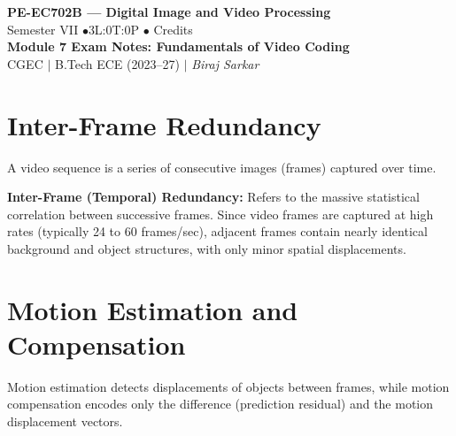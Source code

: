 \documentclass[12pt,a4paper]{article}
\begin{document}

\begin{center}
  {\LARGE\bfseries\color{myred} PE-EC702B --- Digital Image and Video Processing}\\[5pt]
  {\normalsize\color{mydark} Semester VII \quad$\bullet$\quad 3L:0T:0P \quad$\bullet$ Credits}\\[3pt]
  {\normalsize\color{myteal}\textbf{Module 7 Exam Notes: Fundamentals of Video Coding}}\\[3pt]
  {\small\color{mydark} CGEC \;$|$\; B.Tech ECE (2023--27) \;$|$\; \textit{Biraj Sarkar}}
\end{center}
\vspace{2pt}
\noindent{\color{myred}\rule{\linewidth}{1.5pt}}
\vspace{2pt}

\hypersetup{linkcolor=mydark}
\tableofcontents
\hypersetup{linkcolor=myteal}
\newpage

\section{Inter-Frame Redundancy}

A video sequence is a series of consecutive images (frames) captured over time.

\begin{tcolorbox}[defbox, title={Temporal Redundancy}]
\textbf{Inter-Frame (Temporal) Redundancy:} Refers to the massive statistical correlation between successive frames. Since video frames are captured at high rates (typically 24 to 60 frames/sec), adjacent frames contain nearly identical background and object structures, with only minor spatial displacements.
\end{tcolorbox}

\section{Motion Estimation and Compensation}

Motion estimation detects displacements of objects between frames, while motion compensation encodes only the difference (prediction residual) and the motion displacement vectors.
\end{document}
